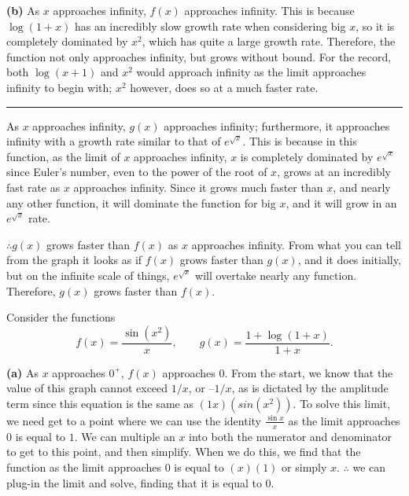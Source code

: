 \documentclass[answers,addpoints]{exam}
\newcommand\pts[1][2]{\textcolor{MyBlue}{\text{\bf [#1 pts]}}}
\begin{document}
\begin{questions}
\begin{solution}
\textbf{(b)}
As $x$ approaches infinity, $f(x)$ approaches infinity. This is because $\log(1+x)$ has an incredibly slow growth rate when considering big $x$, so it is completely dominated by $x^2$, which has quite a large growth rate. Therefore, the function not only approaches infinity, but grows without bound. For the record, both $\log(x+1)$ and $x^2$ would approach infinity as the limit approaches infinity to begin with; $x^2$ however, does so at a much faster rate.

\hrule

As $x$ approaches infinity, $g(x)$ approaches infinity; furthermore, it approaches infinity with a growth rate similar to that of $e^{\sqrt{x}}$. This is because in this function, as the limit of $x$ approaches infinity, $x$ is completely dominated by $e^{\sqrt{x}}$ since Euler’s number, even to the power of the root of $x$, grows at an incredibly fast rate as $x$ approaches infinity. Since it grows much faster than $x$, and nearly any other function, it will dominate the function for big $x$, and it will grow in an $e^{\sqrt{x}}$ rate.

$\therefore g(x)$ grows faster than $f(x)$ as $x$ approaches infinity. From what you can tell from the graph it looks as if $f(x)$ grows faster than $g(x)$, and it does initially, but on the infinite scale of things, $e^{\sqrt{x}}$ will overtake nearly any function. Therefore, $g(x)$ grows faster than $f(x)$.
\end{solution}


\question \pts[4] Consider the functions
\[
f(x)=\frac{\sin(x^2)}{x},\qquad
g(x)=\frac{1+\log(1+x)}{1+x}.
\]

\begin{solution}
\textbf{(a)}
As $x$ approaches $0^+$, $f(x)$ approaches $0$. From the start, we know that the value of this graph cannot exceed $1/x$, or $–1/x$, as is dictated by the amplitude term since this equation is the same as $(1x)(sin(x^2))$. To solve this limit, we need get to a point where we can use the identity $\frac{\sin{x}}{x}$ as the limit approaches $0$ is equal to $1$. We can multiple an $x$ into both the numerator and denominator to get to this point, and then simplify. When we do this, we find that the function as the limit approaches $0$ is equal to $(x)(1)$ or simply $x$. $\therefore$ we can plug-in the limit and solve, finding that it is equal to 0.


\end{solution}
\end{questions}
\end{document}
